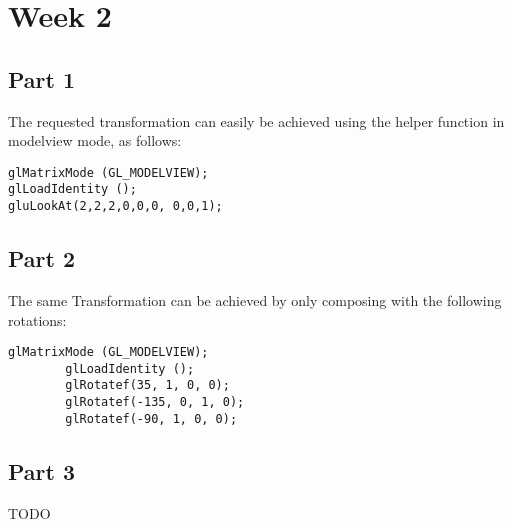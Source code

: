 \chapter{Week 2}

\section{Part 1}

The requested transformation can easily be achieved using the helper function
 in modelview mode, as follows:

\begin{lstlisting}
glMatrixMode (GL_MODELVIEW);
glLoadIdentity ();
gluLookAt(2,2,2,0,0,0, 0,0,1);
\end{lstlisting}


\section{Part 2}
The same Transformation can be achieved by only composing with the following rotations:
\begin{lstlisting}[caption=Extract from Part2.cpp]
        glMatrixMode (GL_MODELVIEW);
        glLoadIdentity ();
        glRotatef(35, 1, 0, 0);
        glRotatef(-135, 0, 1, 0);
        glRotatef(-90, 1, 0, 0);
\end{lstlisting}

\section{Part 3}


TODO

